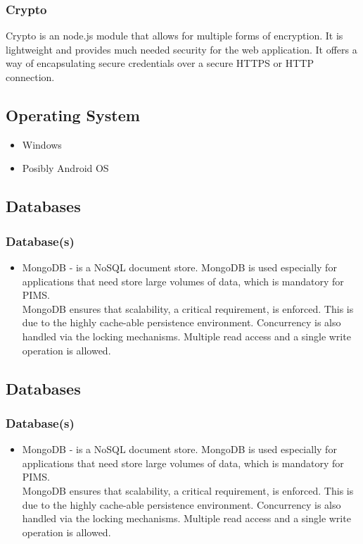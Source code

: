 \subsubsection{Crypto}
Crypto is an node.js module that allows for multiple forms of encryption. It is lightweight and provides much needed security for the web application. It offers a way of encapsulating secure credentials over a secure HTTPS or HTTP connection.

\subsection{Operating System}
\begin{itemize}
		\item Windows
		\item Posibly Android OS
\end{itemize}
	
	
\subsection{Databases}
\subsubsection{Database(s)}
\begin{itemize}
	\item MongoDB - is a NoSQL document store. MongoDB is used especially for applications that need store large volumes of data, which is mandatory for PIMS. \\
	MongoDB ensures that scalability, a critical requirement, is enforced. This is due to the highly cache-able persistence environment. Concurrency is also handled  via the locking mechanisms. Multiple read access and a single write operation is allowed.
\end{itemize}

\subsection{Databases}
\subsubsection{Database(s)}
\begin{itemize}
	\item MongoDB - is a NoSQL document store. MongoDB is used especially for applications that need store large volumes of data, which is mandatory for PIMS. \\
	MongoDB ensures that scalability, a critical requirement, is enforced. This is due to the highly cache-able persistence environment. Concurrency is also handled  via the locking mechanisms. Multiple read access and a single write operation is allowed.
\end{itemize}

